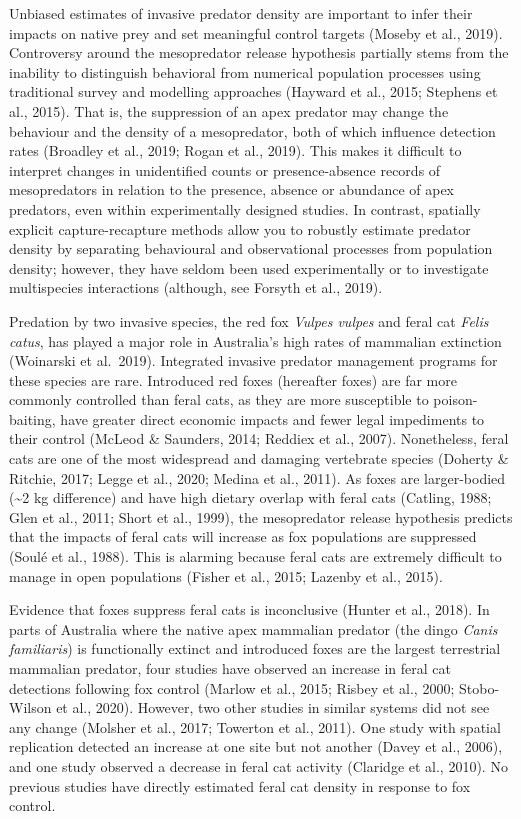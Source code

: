 \documentclass[]{elsarticle} %
\begin{document}
Unbiased estimates of invasive predator density are important to infer their impacts on native prey and set meaningful control targets (Moseby et al., 2019). Controversy around the mesopredator release hypothesis partially stems from the inability to distinguish behavioral from numerical population processes using traditional survey and modelling approaches (Hayward et al., 2015; Stephens et al., 2015). That is, the suppression of an apex predator may change the behaviour and the density of a mesopredator, both of which influence detection rates (Broadley et al., 2019; Rogan et al., 2019). This makes it difficult to interpret changes in unidentified counts or presence-absence records of mesopredators in relation to the presence, absence or abundance of apex predators, even within experimentally designed studies. In contrast, spatially explicit capture-recapture methods allow you to robustly estimate predator density by separating behavioural and observational processes from population density; however, they have seldom been used experimentally or to investigate multispecies interactions (although, see Forsyth et al., 2019).

Predation by two invasive species, the red fox \emph{Vulpes vulpes} and feral cat \emph{Felis catus}, has played a major role in Australia's high rates of mammalian extinction (Woinarski et al.~2019). Integrated invasive predator management programs for these species are rare. Introduced red foxes (hereafter foxes) are far more commonly controlled than feral cats, as they are more susceptible to poison-baiting, have greater direct economic impacts and fewer legal impediments to their control (McLeod \& Saunders, 2014; Reddiex et al., 2007). Nonetheless, feral cats are one of the most widespread and damaging vertebrate species (Doherty \& Ritchie, 2017; Legge et al., 2020; Medina et al., 2011). As foxes are larger-bodied (\textasciitilde2 kg difference) and have high dietary overlap with feral cats (Catling, 1988; Glen et al., 2011; Short et al., 1999), the mesopredator release hypothesis predicts that the impacts of feral cats will increase as fox populations are suppressed (Soulé et al., 1988). This is alarming because feral cats are extremely difficult to manage in open populations (Fisher et al., 2015; Lazenby et al., 2015).

Evidence that foxes suppress feral cats is inconclusive (Hunter et al., 2018). In parts of Australia where the native apex mammalian predator (the dingo \emph{Canis familiaris}) is functionally extinct and introduced foxes are the largest terrestrial mammalian predator, four studies have observed an increase in feral cat detections following fox control (Marlow et al., 2015; Risbey et al., 2000; Stobo-Wilson et al., 2020). However, two other studies in similar systems did not see any change (Molsher et al., 2017; Towerton et al., 2011). One study with spatial replication detected an increase at one site but not another (Davey et al., 2006), and one study observed a decrease in feral cat activity (Claridge et al., 2010). No previous studies have directly estimated feral cat density in response to fox control.
\end{document}
